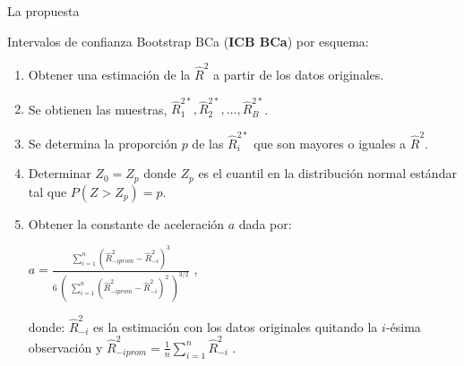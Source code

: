 \documentclass[serif, aspectratio=169]{beamer}
\begin{document}
\begin{frame}{La propuesta}
	

	Intervalos de confianza Bootstrap BCa (\textbf{ICB BCa}) por esquema:

\begin{enumerate}
\item Obtener una estimación de la $\hat{R}^2$ a partir de los datos originales.

\item Se obtienen las muestras, $\hat{R}^{2*}_{1} , \hat{R}^{2*}_{2}, \dots,\hat{R}^{2*}_{B}$.

\item Se determina la proporción $p$ de las $\hat{R}^{2*}_{i}$ que son mayores o iguales a $\hat{R}^2$.

\item  Determinar $Z_{0} = Z_{p}$ donde $Z_{p}$ es el cuantil en la distribución normal estándar tal que $P(Z > Z_{p}) = p$.

\item  Obtener la constante de aceleración $a$ dada por:
\begin{center}
	\Large $ a = \frac{\sum_{i=1}^{n}  (\hat{R}^{2}_{-iprom}  - \hat{R}^{2}_{-i})^{3} }{ 6 \; (\; \sum_{i=1}^{n}  ( \hat{R}^{2}_{-iprom}  - \hat{R}^{2}_{-i})^{2} \; )^{3/2}} $ ,
\end{center}

donde: $\hat{R}^{2}_{-i}$ es la estimación con los datos originales quitando la $i$-ésima observación y {\normalsize $\hat{R}^{2}_{-iprom} = \frac{1}{n} \sum_{i=1}^{n}\hat{R}^{2}_{-i}$} .
\end{enumerate}
\end{frame}
\end{document}
